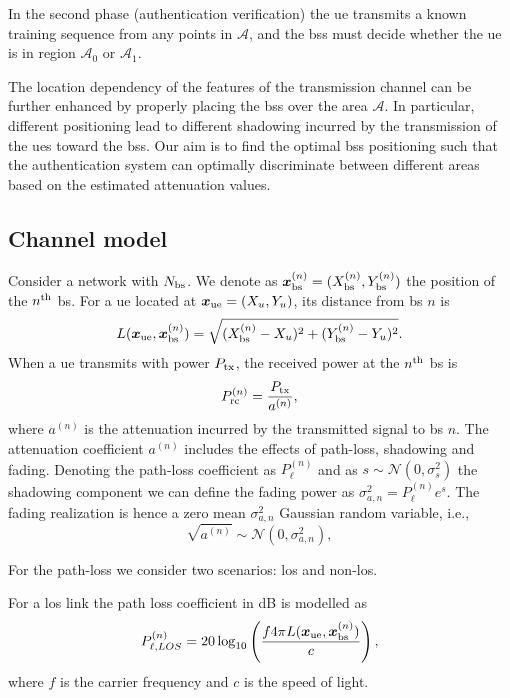 \documentclass[twocolumns]{IEEEtran}
\begin{document}
In the second phase (authentication verification) the \ac{ue} transmits a known training sequence from any points in $\mathcal{A}$, and the \acp{bs} must decide whether the \ac{ue} is in region $\mathcal{A}_0$ or $\mathcal{A}_1$.

The location dependency of the features of the transmission channel can be further enhanced by properly placing the \acp{bs} over the area $\mathcal{A}$. In particular, different positioning lead to different shadowing incurred by the transmission of the \acp{ue} toward the \acp{bs}. Our aim is to find the optimal \acp{bs} positioning such that the authentication system can optimally discriminate between different areas based on the estimated attenuation values.

\subsection{Channel model}

Consider a network with $N_{\rm bs}$. We denote as $\bm{x}_{\rm bs}^{(n)} =(X_{\rm bs}^{(n)},Y_{\rm bs}^{(n)})$ the position of the $n^{\rm th}$ \ac{bs}. For a \ac{ue} located at $\bm{x}_{\rm ue}=(X_u,Y_u)$, its distance from \ac{bs} $n$ is
\begin{equation}
    L(\bm{x}_{\rm ue},\bm{x}_{\rm bs}^{(n)}) = \sqrt{(X_{\rm bs}^{(n)}-X_u)^2+(Y_{\rm bs}^{(n)}-Y_u)^2}.
\end{equation}
When a \ac{ue} transmits with power $P_{\rm tx}$, the received power at the $n^{\rm th}$ \ac{bs} is
\begin{equation}\label{eq: rec pow}
    P_{\rm rc}^{(n)}= \frac{P_{\rm tx}}{a^{(n)}},
\end{equation}
where $a^{(n)}$ is the attenuation incurred by the transmitted signal to \ac{bs} $n$. The attenuation coefficient $a^{(n)}$ includes the effects of path-loss, shadowing and fading. Denoting the path-loss coefficient as $P_{\ell}^{(n)}$ and as $s \sim \mathcal{N}(0,\sigma_s^2)$ the shadowing component we can define the fading power as $\sigma_{a,n}^2={P_{\ell}^{(n)}}e^{s}$. The fading realization is hence a zero mean $\sigma_{a,n}^2$ Gaussian random variable, i.e.,
\begin{equation}
    \sqrt{a^{(n)}} \sim \mathcal{N}\left(0,\sigma_{a,n}^2\right),
\end{equation}

For the path-loss we consider two scenarios: \ac{los} and non-\ac{los}.

For a \ac{los} link the path loss coefficient in dB is modelled as
\begin{equation}\label{eq:los}
    P_{\ell,LOS}^{(n)} = 20\log_{10}\left(\frac{f 4\pi L(\bm{x}_{\rm ue},\bm{x}_{\rm bs}^{(n)})}{c}\right),
\end{equation}
where $f$ is the carrier frequency and $c$ is the speed of light.
\end{document}
